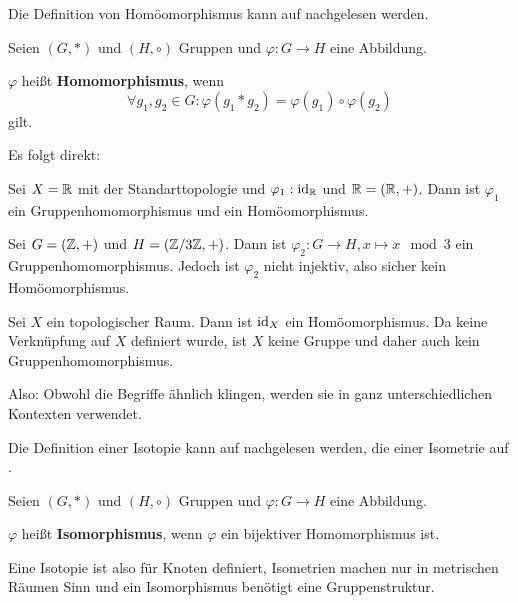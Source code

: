 \begin{solution}[\ref{ub3:meinsExtra}]
    Die Definition von Homöomorphismus kann auf 
    nachgelesen werden.

    \begin{definition}%
        Seien $(G, *)$ und $(H, \circ)$ Gruppen und
        $\varphi:G \rightarrow H$ eine Abbildung.

        $\varphi$ heißt \textbf{Homomorphismus}, wenn
        \[\forall g_1, g_2 \in G: \varphi(g_1 * g_2) = \varphi(g_1) \circ \varphi(g_2)\]
        gilt.
    \end{definition}

    Es folgt direkt:
    \begin{bspenum}
        \item Sei $X = \mathbb{R}$ mit der Standarttopologie und $\varphi_1: \textnormal{id}_{\mathbb{R}}$ und $\mathbb{R} = (\mathbb{R},+)$. Dann ist $\varphi_1$ ein Gruppenhomomorphismus und ein Homöomorphismus.
        \item Sei $G = (\mathbb{Z}, +)$ und $H = (\mathbb{Z} / 3 \mathbb{Z}, +)$. Dann ist $\varphi_2 : G \rightarrow H, x \mapsto x \mod 3$ ein Gruppenhomomorphismus.
              Jedoch ist $\varphi_2$ nicht injektiv, also sicher kein Homöomorphismus.
        \item Sei $X$ ein topologischer Raum. Dann ist $\textnormal{id}_X$ ein Homöomorphismus. Da keine Verknüpfung auf $X$ definiert wurde, ist $X$ keine Gruppe und daher auch kein Gruppenhomomorphismus.
    \end{bspenum}

    Also: Obwohl die Begriffe ähnlich klingen, werden sie in ganz unterschiedlichen
    Kontexten verwendet.
\end{solution}

\begin{solution}[\ref{ub3:meinsExtra2}]
    Die Definition einer Isotopie kann auf  nachgelesen
    werden, die einer Isometrie auf .

    \begin{definition}%
        Seien $(G, *)$ und $(H, \circ)$ Gruppen und
        $\varphi:G \rightarrow H$ eine Abbildung.

        $\varphi$ heißt \textbf{Isomorphismus}, wenn $\varphi$ ein bijektiver
        Homomorphismus ist.
    \end{definition}

    Eine Isotopie ist also für Knoten definiert, Isometrien machen nur in
    metrischen Räumen Sinn und ein Isomorphismus benötigt eine Gruppenstruktur.
\end{solution}


